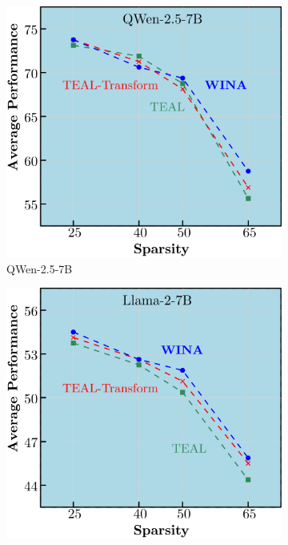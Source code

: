 {\begin{figure}[t]
    \centering
    \begin{subfigure}[t]{0.24\linewidth}
        \centering
        \includegraphics[width=\linewidth]{qwen_2.5_7b.png}
        \caption{QWen-2.5-7B}
        \label{fig:qwen-2.5-7b}
    \end{subfigure}
    \begin{subfigure}[t]{0.24\linewidth}
        \centering        \includegraphics[width=\linewidth]{llama_2_7b.png}

\end{subfigure}
\end{figure}}
